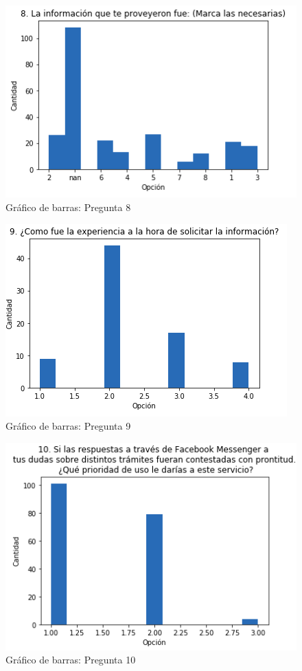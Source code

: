             \begin{figure}[H]
                \centering
                \includegraphics[width=.8\linewidth]{Latex/Classes/Imagenes/8.png}
                \caption{Gráfico de barras: Pregunta 8}
            \end{figure}\begin{figure}[H]
                \centering
                \includegraphics[width=.8\linewidth]{Latex/Classes/Imagenes/9.png}
                \caption{Gráfico de barras: Pregunta 9}
            \end{figure}
            \begin{figure}[H]
                \centering
                \includegraphics[width=.8\linewidth]{Latex/Classes/Imagenes/10.png}
                \caption{Gráfico de barras: Pregunta 10}
            \end{figure}
            
